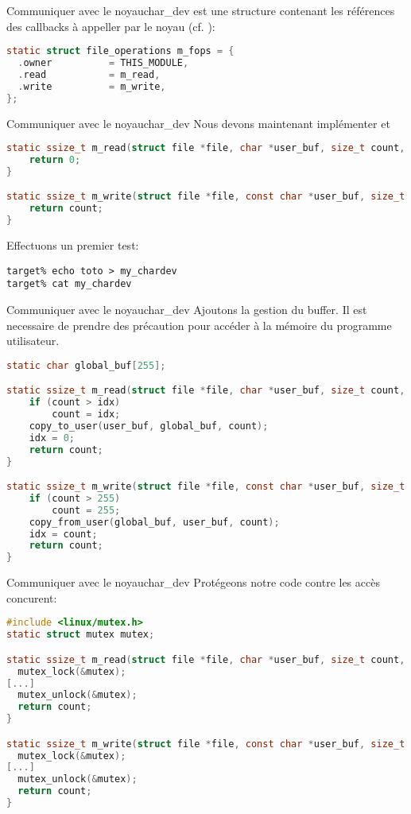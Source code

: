 \begin{frame}[fragile=singleslide]{Communiquer avec le noyau}{char\_dev}
   est une structure contenant les références des callbacks à appeller par le noyau (cf. ):
  \begin{lstlisting}[language=c]
static struct file_operations m_fops = {
  .owner          = THIS_MODULE,
  .read           = m_read,
  .write          = m_write,
};
  \end{lstlisting}
\end{frame}

\begin{frame}[fragile=singleslide]{Communiquer avec le noyau}{char\_dev}
Nous devons maintenant implémenter  et 
  \begin{lstlisting}[language=c]
static ssize_t m_read(struct file *file, char *user_buf, size_t count, loff_t *ppos) {
    return 0;
}

static ssize_t m_write(struct file *file, const char *user_buf, size_t count, loff_t *ppos) {
    return count;
}
  \end{lstlisting}
Effectuons un premier test:
  \begin{lstlisting}
target% echo toto > my_chardev
target% cat my_chardev
  \end{lstlisting}
\end{frame}

\begin{frame}[fragile=singleslide]{Communiquer avec le noyau}{char\_dev}
Ajoutons la gestion du buffer. Il est necessaire de prendre des précaution pour
accéder à la mémoire du programme utilisateur.
  \begin{lstlisting}[language=c]
static char global_buf[255];

static ssize_t m_read(struct file *file, char *user_buf, size_t count, loff_t *ppos) {
    if (count > idx)
        count = idx;
    copy_to_user(user_buf, global_buf, count);
    idx = 0;
    return count;
}

static ssize_t m_write(struct file *file, const char *user_buf, size_t count, loff_t *ppos) {
    if (count > 255)
        count = 255;
    copy_from_user(global_buf, user_buf, count);
    idx = count;
    return count;
}
  \end{lstlisting}
\end{frame}

\begin{frame}[fragile=singleslide]{Communiquer avec le noyau}{char\_dev}
Protégeons notre code contre les accès concurent:
  \begin{lstlisting}[language=c]
#include <linux/mutex.h>
static struct mutex mutex;

static ssize_t m_read(struct file *file, char *user_buf, size_t count, loff_t *ppos) {
  mutex_lock(&mutex);
[...]
  mutex_unlock(&mutex);
  return count;
}

static ssize_t m_write(struct file *file, const char *user_buf, size_t count, loff_t *ppos) {
  mutex_lock(&mutex);
[...]
  mutex_unlock(&mutex);
  return count;
}
  \end{lstlisting}
\end{frame}

